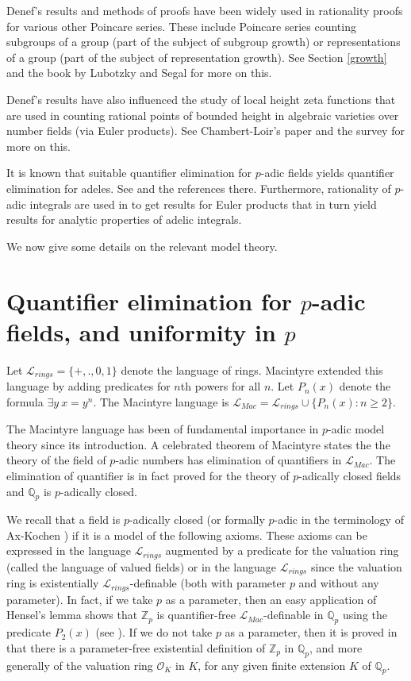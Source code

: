 \documentclass[12pt]{amsart}
\def\Z{\mathbb{Z}}
\def\cL{\mathcal{L}}
\def\Q{\mathbb{Q}}
\def\cL{\mathcal{L}}
\def\cO{\mathcal{O}}
\numberwithin{equation}{section}
\begin{document}
Denef's results and methods of proofs have been widely used in rationality proofs for various other Poincare series. These include Poincare series counting subgroups of a group (part of the subject of subgroup growth) or representations 
of a group (part of the subject of representation growth). See Section \ref{growth} and the book by 
Lubotzky and Segal \cite{alex-dan-book} for more on this.

Denef's results have also influenced 
the study of local height zeta functions that are used in counting rational points of bounded height in algebraic varieties over number fields (via Euler products). See Chambert-Loir's paper \cite{loir-surv} and the survey \cite{adeles-surv} for more on this.

It is known that suitable quantifier elimination for $p$-adic fields yields quantifier elimination for adeles. See \cite{adeles-surv}and the references there. Furthermore, rationality of $p$-adic integrals are used in \cite{zeta1} to get results for Euler products that in turn yield results for analytic properties of adelic integrals. 


We now give some details on the relevant model theory.


\section{\bf Quantifier elimination for $p$-adic fields, and uniformity in $p$}\label{qe}

Let $\cL_{rings}=\{+,.,0,1\}$ denote the language of rings. Macintyre extended this language by adding predicates for 
$n$th powers for all $n$. Let $P_n(x)$ denote the formula $\exists y \ x=y^n$. The Macintyre language is $\cL_{Mac}=\cL_{rings} \cup \{P_n(x): n\geq 2\}$.

The Macintyre language has been of fundamental importance in $p$-adic model theory since its introduction. A celebrated theorem of Macintyre states the the theory of the field of $p$-adic numbers has elimination of quantifiers in $\cL_{Mac}$. 
The elimination of quantifier is in fact proved for the theory of $p$-adically closed fields and $\Q_p$ is $p$-adically closed. 

We recall that a field is $p$-adically closed (or formally $p$-adic in the terminology of Ax-Kochen \cite{AK2}) if it 
is a model of the following axioms. These axioms can be expressed in the language $\cL_{rings}$ augmented by a predicate 
for the valuation ring (called the language of valued fields) or in the language $\cL_{rings}$ since the valuation ring is 
existentially 
$\cL_{rings}$-definable (both with parameter $p$ and without any parameter). In fact, if we take $p$ as a parameter, then an easy application of Hensel's lemma shows that $\Z_p$ is quantifier-free 
$\cL_{Mac}$-definable in $\Q_p$ using the predicate $P_2(x)$ (see \cite[Lemma 2.1]{Denefrationality}). If we do not 
take $p$ as a  parameter, then it is proved in \cite{CDLM} that there is a parameter-free existential definition of $\Z_p$ in $\Q_p$, and more generally of the valuation ring $\cO_K$ in $K$, for any given finite extension $K$ of $\Q_p$.
\end{document}
